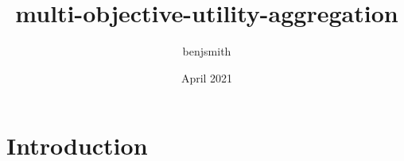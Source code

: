 \documentclass{article}
\title{multi-objective-utility-aggregation}
\author{benjsmith }
\date{April 2021}
\begin{document}
\maketitle

\section{Introduction}
\end{document}
